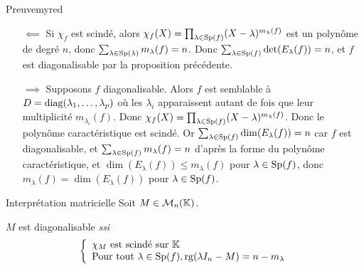     \begin{demo}{Preuve}{myred}
        \begin{itemize}
            \item[$\impliedby$] Si $\chi_f$ est scindé, alors $\chi_f(X) = \prod_{\lambda \in \operatorname{Sp}(f)} (X-\lambda)^{m_{\lambda}(f)}$ est un polynôme de degré $n$, donc $\sum_{\lambda \in \operatorname{Sp}(\lambda)} m_{\lambda}(f) = n$. Donc $\sum_{\lambda \in \operatorname{Sp}(f)} \operatorname{det}(E_{\lambda}(f)) = n$, et $f$ est diagonalisable par la proposition précédente.
            \item[$\implies$] Supposons $f$ diagonalisable. Alors $f$ est semblable à $D = \operatorname{diag}(\lambda_1,\ldots,\lambda_p)$ où les $\lambda_i$ apparaissent autant de fois que leur multiplicité $m_{\lambda_i}(f)$. Donc $\chi_f(X) = \prod_{\lambda \in \operatorname{Sp}(f)} (X - \lambda)^{m_{\lambda}(f)}$. Donc le polynôme caractéristique est scindé. Or $\sum_{\lambda \in \operatorname{Sp}(f)} \dim(E_{\lambda}(f)) = n$ car $f$ est diagonalisable, et $\sum_{\lambda \in \operatorname{Sp}(f)} m_{\lambda}(f) = n$ d’après la forme du polynôme caractéristique, et $\dim(E_{\lambda}(f)) \leq m_{\lambda}(f)$ pour $\lambda \in \operatorname{Sp}(f)$, donc $m_{\lambda}(f) = \dim(E_{\lambda}(f))$ pour $\lambda \in \operatorname{Sp}(f)$.
        \end{itemize}
    \end{demo}

    \begin{coro}{Interprétation matricielle}{}
        Soit $M \in \mathcal{M}_{n}(\mathbb{K})$.

        $M$ est diagonalisable \textit{ssi}
        \[ \et{\chi_M \text{ est scindé sur } \mathbb{K}}{\text{Pour tout } \lambda \in \Sp(f), \rg(\lambda I_n - M) = n - m_{\lambda}} \]
    \end{coro}

